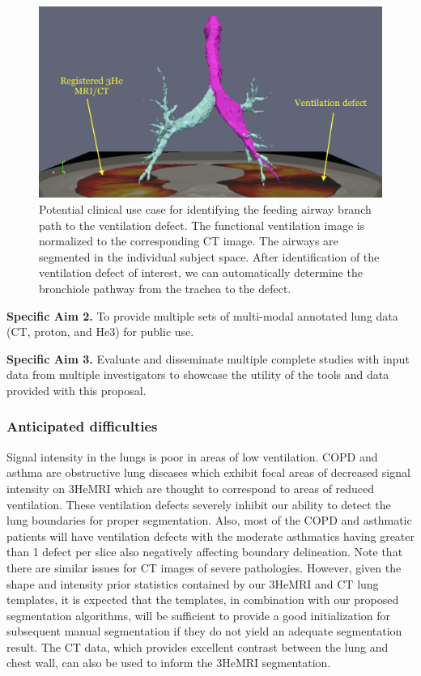 \documentclass[11pt,]{article}
\begin{document}
\begin{figure}[htbp]
\centering
\includegraphics{Figs/airways.png}
\caption{Potential clinical use case for identifying the feeding airway
branch path to the ventilation defect. The functional ventilation image
is normalized to the corresponding CT image. The airways are segmented
in the individual subject space. After identification of the ventilation
defect of interest, we can automatically determine the bronchiole
pathway from the trachea to the defect.}
\end{figure}

\textbf{Specific Aim 2.} To provide multiple sets of multi-modal
annotated lung data (CT, proton, and He3) for public use.

\textbf{Specific Aim 3.} Evaluate and disseminate multiple complete
studies with input data from multiple investigators to showcase the
utility of the tools and data provided with this proposal.

\subsubsection{Anticipated difficulties}\label{anticipated-difficulties}

Signal intensity in the lungs is poor in areas of low ventilation. COPD
and asthma are obstructive lung diseases which exhibit focal areas of
decreased signal intensity on 3HeMRI which are thought to correspond to
areas of reduced ventilation. These ventilation defects severely inhibit
our ability to detect the lung boundaries for proper segmentation. Also,
most of the COPD and asthmatic patients will have ventilation defects
with the moderate asthmatics having greater than 1 defect per slice also
negatively affecting boundary delineation. Note that there are similar
issues for CT images of severe pathologies. However, given the shape and
intensity prior statistics contained by our 3HeMRI and CT lung
templates, it is expected that the templates, in combination with our
proposed segmentation algorithms, will be sufficient to provide a good
initialization for subsequent manual segmentation if they do not yield
an adequate segmentation result. The CT data, which provides excellent
contrast between the lung and chest wall, can also be used to inform the
3HeMRI segmentation.
\end{document}
